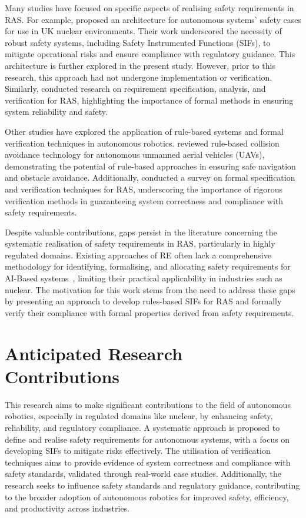 \documentclass[conference]{IEEEtran}
\newcommand{\louisenote}[1]{\todo[color=green!65]{Louise: #1}}
\begin{document}
Many studies have focused on specific aspects of realising safety requirements in RAS. For example, \cite{Louise&Chris} proposed an architecture for autonomous systems' safety cases for use in UK nuclear environments. Their work underscored the necessity of robust safety systems, including Safety Instrumented Functions (SIFs), to mitigate operational risks and ensure compliance with regulatory guidance. This architecture is further explored in the present study. However, prior to this research, this approach had not undergone implementation or verification. Similarly, \cite{PintoA} conducted research on requirement specification, analysis, and verification for RAS, highlighting the importance of formal methods in ensuring system reliability and safety.

Other studies have explored the application of rule-based systems and formal verification techniques in autonomous robotics. \cite{RBSystemUAV} reviewed rule-based collision avoidance technology for autonomous unmanned aerial vehicles (UAVs), demonstrating the potential of rule-based approaches in ensuring safe navigation and obstacle avoidance. Additionally, \cite{FormalSpecificationAndVerification} conducted a survey on formal specification and verification techniques for RAS, underscoring the importance of rigorous verification methods in guaranteeing system correctness and compliance with safety requirements.

Despite valuable contributions, gaps persist in the literature concerning the systematic realisation of safety requirements in RAS, %
particularly in highly regulated domains. Existing approaches of RE often lack a comprehensive methodology for identifying, formalising, and allocating safety requirements for AI-Based systems~\cite{REChallenges}, limiting their practical applicability in industries such as nuclear. The motivation for this work stems from the need to address these gaps by presenting an approach to develop rules-based SIFs for RAS and formally verify their compliance with formal properties derived from safety requirements.


\section{Anticipated Research Contributions}

This research aims to make significant contributions to the field of autonomous robotics, especially in regulated domains like nuclear, by enhancing safety, reliability, and regulatory compliance. A systematic approach is proposed to define and realise safety requirements for autonomous systems, with a focus on developing SIFs to mitigate risks effectively. The utilisation of verification techniques aims to provide evidence of system correctness and compliance with safety standards, validated through real-world case studies. Additionally, the research seeks to influence safety standards and regulatory guidance, contributing to the broader adoption of autonomous robotics for improved safety, efficiency, and productivity across industries.
\end{document}
